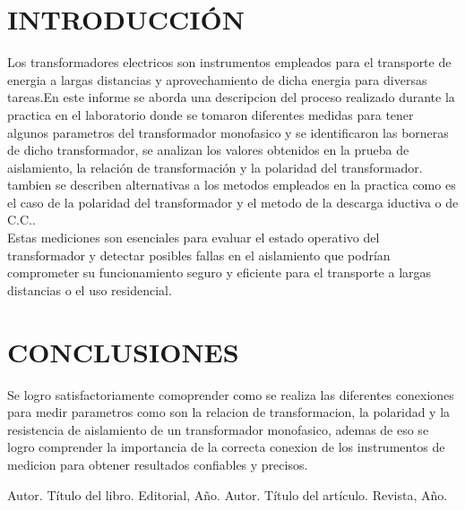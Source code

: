 \documentclass[a4paper, 12pt]{article}
\begin{document}
\section{INTRODUCCIÓN }
Los transformadores electricos son instrumentos empleados para el transporte de energia a largas distancias y aprovechamiento de dicha energia para diversas tareas.En este informe se aborda una descripcion del proceso realizado durante la practica en el laboratorio donde se tomaron diferentes medidas para tener algunos parametros del transformador monofasico y se identificaron las borneras de dicho transformador, se analizan los valores obtenidos en la prueba de aislamiento, la relación de transformación y la polaridad del transformador. tambien se describen alternativas a los metodos empleados en la practica como es el caso de la polaridad del transformador y el metodo de la descarga iductiva o de C.C..\\ \newline Estas mediciones son esenciales para evaluar el estado operativo del transformador y detectar posibles fallas en el aislamiento que podrían comprometer su funcionamiento seguro y eficiente para el transporte a largas distancias o el uso residencial.

\section{CONCLUSIONES}
Se logro satisfactoriamente comoprender como se realiza las diferentes conexiones para medir parametros como son la relacion de transformacion, la polaridad y la resistencia de aislamiento de un transformador monofasico, ademas de eso se logro comprender la importancia de la correcta conexion de los instrumentos de medicion para obtener resultados confiables y precisos. 

\begin{thebibliography}{99}
 Autor. Título del libro. Editorial, Año.
 Autor. Título del artículo. Revista, Año.
\end{thebibliography}
\end{document}
